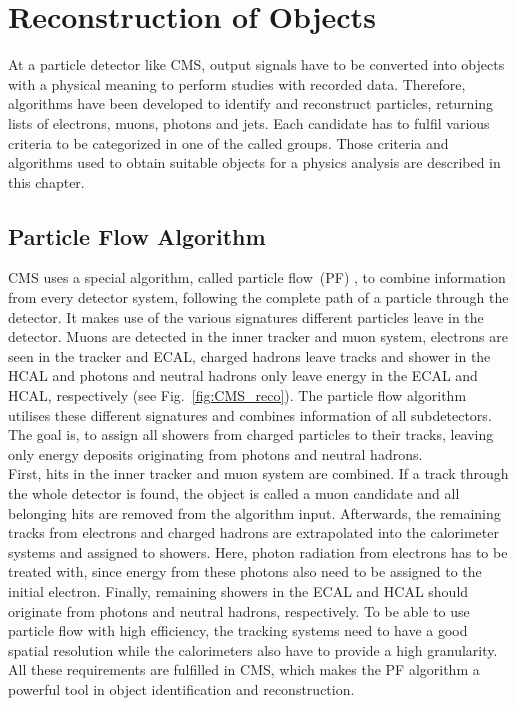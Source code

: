 \chapter{Reconstruction of Objects}
\label{ch:Reco}
	At a particle detector like CMS, output signals have to be converted into objects with a physical meaning to perform studies with recorded data. Therefore, algorithms have been developed to identify and reconstruct particles, returning lists of electrons, muons, photons and jets. Each candidate has to fulfil various criteria to be categorized in one of the called groups. Those criteria and algorithms used to obtain suitable objects for a physics analysis are described in this chapter.

\section{Particle Flow Algorithm}
\label{sec:pf}
	CMS uses a special algorithm, called particle flow~(PF) \cite{particleflow}, to combine information from every detector system, following the complete path of a particle through the detector. It makes use of the various signatures different particles leave in the detector. Muons are detected in the inner tracker and muon system, electrons are seen in the tracker and ECAL, charged hadrons leave tracks and shower in the HCAL and photons and neutral hadrons only leave energy in the ECAL and HCAL, respectively (see Fig.~\ref{fig:CMS_reco}). The particle flow algorithm utilises these different signatures and combines information of all subdetectors. The goal is, to assign all showers from charged particles to their tracks, leaving only energy deposits originating from photons and neutral hadrons.\\
	First, hits in the inner tracker and muon system are combined. If a track through the whole detector is found, the object is called a muon candidate and all belonging hits are removed from the algorithm input. Afterwards, the remaining tracks from electrons and charged hadrons are extrapolated into the calorimeter systems and assigned to showers. Here, photon radiation from electrons has to be treated with, since energy from these photons also need to be assigned to the initial electron. Finally, remaining showers in the ECAL and HCAL should originate from photons and neutral hadrons, respectively. To be able to use particle flow with high efficiency, the tracking systems need to have a good spatial resolution while the calorimeters also have to provide a high granularity. All these requirements are fulfilled in CMS, which makes the PF algorithm a powerful tool in object identification and reconstruction.

